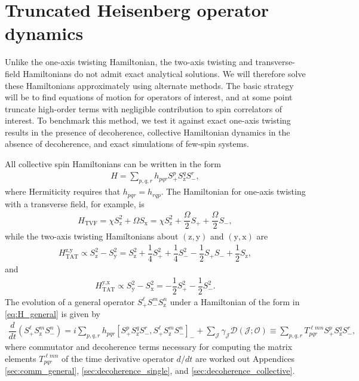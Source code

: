 \documentclass[aps,notitlepage,nofootinbib,11pt]{revtex4-1}
\renewcommand{\t}{\text} %
\newcommand{\f}[2]{\dfrac{#1}{#2}} %
\newcommand{\p}[1]{\left(#1\right)} %
\renewcommand{\sp}[1]{\left[#1\right]} %
\newcommand{\D}{\mathcal{D}}
\newcommand{\J}{\mathcal{J}}
\renewcommand{\O}{\mathcal{O}}
\newcommand{\z}{\text{z}}
\newcommand{\x}{\text{x}}
\newcommand{\y}{\text{y}}
\newcommand{\1}{\mathds{1}}
\begin{document}
\section{Truncated Heisenberg operator dynamics}

Unlike the one-axis twisting Hamiltonian, the two-axis twisting and
transverse-field Hamiltonians do not admit exact analytical
solutions. We will therefore solve these Hamiltonians approximately
using alternate methods.  The basic strategy will be to find equations
of motion for operators of interest, and at some point truncate
high-order terms with negligible contribution to spin correlators of
interest.  To benchmark this method, we test it against exact one-axis
twisting results in the presence of decoherence, collective
Hamiltonian dynamics in the absence of decoherence, and exact
simulations of few-spin systems.

All collective spin Hamiltonians can be written in the form
\begin{align}
  H = \sum_{p,q,r} h_{pqr} S_+^p S_\z^q S_-^r,
  \label{eq:H_general}
\end{align}
where Hermiticity requires that $h_{pqr}=h_{rqp}$.  The Hamiltonian
for one-axis twisting with a transverse field, for example, is
\begin{align}
  H_{\t{TVF}}
  = \chi S_\z^2 + \Omega S_\x
  = \chi S_\z^2 + \f{\Omega}{2} S_+ + \f{\Omega}{2} S_-,
\end{align}
while the two-axis twisting Hamiltonians about $\p{\z,\y}$ and
$\p{\y,\x}$ are
\begin{align}
  H_{\t{TAT}}^{\z,\y}
  \propto S_\z^2 - S_\y^2
  = S_\z^2 + \f14 S_+^2 + \f14 S_-^2
  - \f12 S_+ S_- + \f12 S_\z,
\end{align}
and
\begin{align}
  H_{\t{TAT}}^{\y,\x}
  \propto S_\y^2 - S_\x^2
  = -\f12 S_+^2 - \f12 S_-^2.
\end{align}
The evolution of a general operator $S_+^\ell S_-^m S_\z^n$ under a
Hamiltonian of the form in \eqref{eq:H_general} is given by
\begin{align}
  \f{d}{dt} \p{S_+^\ell S_\z^m S_-^n}
  = i \sum_{p,q,r} h_{pqr}
  \sp{S_+^p S_\z^q S_-^r, S_+^\ell S_\z^m S_-^n}_-
  + \sum_\J \gamma_\J \D\p{\J;\O}
  \equiv \sum_{p,q,r} T^{\ell m n}_{pqr} S_+^p S_\z^q S_-^r,
  \label{eq:time_derivative}
\end{align}
where commutator and decoherence terms necessary for computing the
matrix elements $T^{\ell m n}_{pqr}$ of the time derivative operator
$d/dt$ are worked out Appendices \ref{sec:comm_general},
\ref{sec:decoherence_single}, and \ref{sec:decoherence_collective}.
\end{document}
